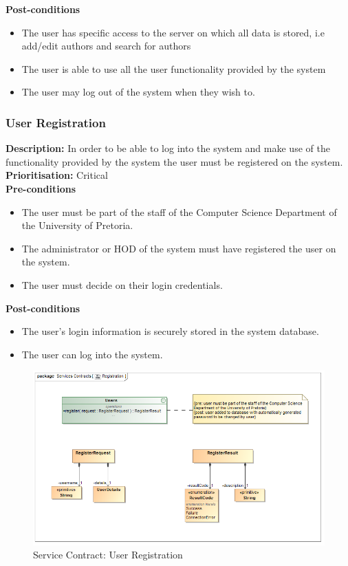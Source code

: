 \documentclass[a4paper]{article}
\begin{document}
    \textbf{Post-conditions}
     \begin{itemize}
        \item The user has specific access to the server on which all data is stored, i.e add/edit authors and search for authors
        \item The user is able to use all the user functionality provided by the system 
        \item The user may log out of the system when they wish to.
    \end{itemize}
    
    \pagebreak
    
    \subsubsection{User Registration}
    
    \textbf{Description:}  In order to be able to log into the system and make use of the functionality provided by the system the user must be registered on the system. \\
    \textbf{Prioritisation:} Critical\\
   
    \textbf{Pre-conditions}
     \begin{itemize}
        \item The user must be part of the staff of the Computer Science Department of the University of Pretoria.
        \item The administrator or HOD of the system must have registered the user on the system.
        \item The user must decide on their login credentials.
   \end{itemize}
    
    \textbf{Post-conditions}
    \begin{itemize}
        \item The user's login information is securely stored in the system database.
        \item The user can log into the system.
    \end{itemize}
    
    	\begin{figure}[H]
    		\centering
    		\includegraphics[width=\textwidth]{5.1.2.Registration.Services.Contract.png}
    		\caption{Service Contract: User Registration}
    	\end{figure}
    
\end{document}
